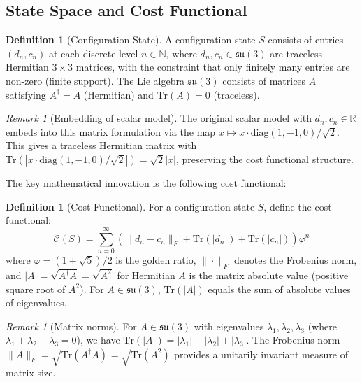 \documentclass[11pt]{article}
\numberwithin{equation}{section}
\theoremstyle{definition}
\newtheorem{definition}[theorem]{Definition}
\theoremstyle{remark}
\newtheorem{remark}[theorem]{Remark}
\begin{document}
\subsection{State Space and Cost Functional}

\begin{definition}[Configuration State]
A configuration state $S$ consists of entries $(d_n, c_n)$ at each discrete level $n \in \mathbb{N}$, where $d_n, c_n \in \mathfrak{su}(3)$ are traceless Hermitian $3 \times 3$ matrices, with the constraint that only finitely many entries are non-zero (finite support). The Lie algebra $\mathfrak{su}(3)$ consists of matrices $A$ satisfying $A^\dagger = A$ (Hermitian) and $\text{Tr}(A) = 0$ (traceless).
\end{definition}

\begin{remark}[Embedding of scalar model]
The original scalar model with $d_n, c_n \in \mathbb{R}$ embeds into this matrix formulation via the map $x \mapsto x \cdot \text{diag}(1,-1,0)/\sqrt{2}$. This gives a traceless Hermitian matrix with $\text{Tr}(|x \cdot \text{diag}(1,-1,0)/\sqrt{2}|) = \sqrt{2}|x|$, preserving the cost functional structure.
\end{remark}

The key mathematical innovation is the following cost functional:

\begin{definition}[Cost Functional]
For a configuration state $S$, define the cost functional:
\begin{equation}
\mathcal{C}(S) = \sum_{n=0}^{\infty} \left(\|d_n - c_n\|_F + \text{Tr}(|d_n|) + \text{Tr}(|c_n|)\right) \varphi^n
\end{equation}
where $\varphi = (1+\sqrt{5})/2$ is the golden ratio, $\|\cdot\|_F$ denotes the Frobenius norm, and $|A| = \sqrt{A^\dagger A} = \sqrt{A^2}$ for Hermitian $A$ is the matrix absolute value (positive square root of $A^2$). For $A \in \mathfrak{su}(3)$, $\text{Tr}(|A|)$ equals the sum of absolute values of eigenvalues.
\end{definition}

\begin{remark}[Matrix norms]
For $A \in \mathfrak{su}(3)$ with eigenvalues $\lambda_1, \lambda_2, \lambda_3$ (where $\lambda_1 + \lambda_2 + \lambda_3 = 0$), we have $\text{Tr}(|A|) = |\lambda_1| + |\lambda_2| + |\lambda_3|$. The Frobenius norm $\|A\|_F = \sqrt{\text{Tr}(A^\dagger A)} = \sqrt{\text{Tr}(A^2)}$ provides a unitarily invariant measure of matrix size.
\end{remark}
\end{document}
